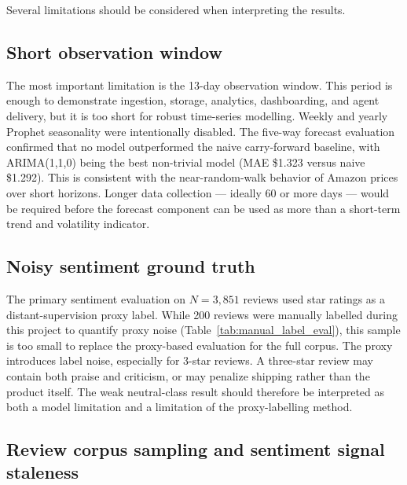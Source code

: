 Several limitations should be considered when interpreting the results.

\subsection{Short observation window}

The most important limitation is the 13-day observation window. This period is enough to demonstrate ingestion, storage, analytics, dashboarding, and agent delivery, but it is too short for robust time-series modelling. Weekly and yearly Prophet seasonality were intentionally disabled. The five-way forecast evaluation confirmed that no model outperformed the naive carry-forward baseline, with ARIMA(1,1,0) being the best non-trivial model (MAE \$1.323 versus naive \$1.292). This is consistent with the near-random-walk behavior of Amazon prices over short horizons. Longer data collection — ideally 60 or more days — would be required before the forecast component can be used as more than a short-term trend and volatility indicator.

\subsection{Noisy sentiment ground truth}

The primary sentiment evaluation on $N = 3{,}851$ reviews used star ratings as a distant-supervision proxy label. While 200 reviews were manually labelled during this project to quantify proxy noise (Table~\ref{tab:manual_label_eval}), this sample is too small to replace the proxy-based evaluation for the full corpus. The proxy introduces label noise, especially for 3-star reviews. A three-star review may contain both praise and criticism, or may penalize shipping rather than the product itself. The weak neutral-class result should therefore be interpreted as both a model limitation and a limitation of the proxy-labelling method.

\subsection{Review corpus sampling and sentiment signal staleness}


